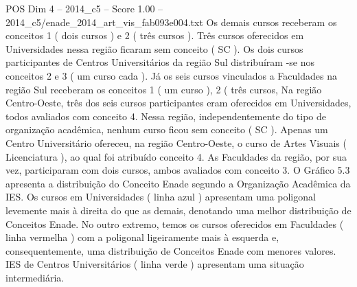 \begin{textsample}{POS Dim 4 – 2014\_c5 – Score 1.00 – 2014\_c5/enade\_2014\_art\_vis\_fab093e004.txt}
Os demais cursos receberam os conceitos 1 ( dois cursos ) e 2 ( três cursos ).
Três cursos oferecidos em Universidades nessa região ficaram sem conceito ( SC ).
Os dois cursos participantes de Centros Universitários da região Sul distribuíram -se nos conceitos 2 e 3 ( um curso cada ).
Já os seis cursos vinculados a Faculdades na região Sul receberam os conceitos 1 ( um curso ), 2 ( três cursos, Na região Centro-Oeste, três dos seis cursos participantes eram oferecidos em Universidades, todos avaliados com conceito 4.
Nessa região, independentemente do tipo de organização acadêmica, nenhum curso ficou sem conceito ( SC ).
Apenas um Centro Universitário ofereceu, na região Centro-Oeste, o curso de Artes Visuais ( Licenciatura ), ao qual foi atribuído conceito 4.
As Faculdades da região, por sua vez, participaram com dois cursos, ambos avaliados com conceito 3.
O Gráfico 5.3 apresenta a distribuição do Conceito Enade segundo a Organização Acadêmica da IES.
Os cursos em Universidades ( linha azul ) apresentam uma poligonal levemente mais à direita do que as demais, denotando uma melhor distribuição de Conceitos Enade.
No outro extremo, temos os cursos oferecidos em Faculdades ( linha vermelha ) com a poligonal ligeiramente mais à esquerda e, consequentemente, uma distribuição de Conceitos Enade com menores valores.
IES de Centros Universitários ( linha verde ) apresentam uma situação intermediária.

\end{textsample}
